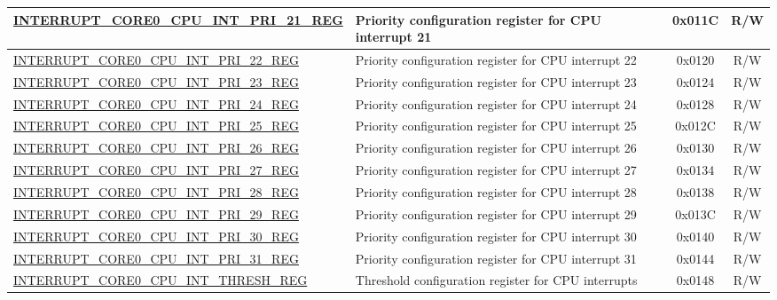 \begin{longtable}{ | p{8.0cm} | p{8.4cm} | c | c| }
\hyperref[regdesc:INTERRUPTCORE0CPUINTPRI0REG]{INTERRUPT\_CORE0\_CPU\_INT\_PRI\_21\_REG} & Priority configuration register for CPU interrupt 21 & 0x011C & R/W \\ \hline
\hyperref[regdesc:INTERRUPTCORE0CPUINTPRI0REG]{INTERRUPT\_CORE0\_CPU\_INT\_PRI\_22\_REG} & Priority configuration register for CPU interrupt 22 & 0x0120 & R/W \\ \hline
\hyperref[regdesc:INTERRUPTCORE0CPUINTPRI0REG]{INTERRUPT\_CORE0\_CPU\_INT\_PRI\_23\_REG} & Priority configuration register for CPU interrupt 23 & 0x0124 & R/W \\ \hline
\hyperref[regdesc:INTERRUPTCORE0CPUINTPRI0REG]{INTERRUPT\_CORE0\_CPU\_INT\_PRI\_24\_REG} & Priority configuration register for CPU interrupt 24 & 0x0128 & R/W \\ \hline
\hyperref[regdesc:INTERRUPTCORE0CPUINTPRI0REG]{INTERRUPT\_CORE0\_CPU\_INT\_PRI\_25\_REG} & Priority configuration register for CPU interrupt 25 & 0x012C & R/W \\ \hline
\hyperref[regdesc:INTERRUPTCORE0CPUINTPRI0REG]{INTERRUPT\_CORE0\_CPU\_INT\_PRI\_26\_REG} & Priority configuration register for CPU interrupt 26 & 0x0130 & R/W \\ \hline
\hyperref[regdesc:INTERRUPTCORE0CPUINTPRI0REG]{INTERRUPT\_CORE0\_CPU\_INT\_PRI\_27\_REG} & Priority configuration register for CPU interrupt 27 & 0x0134 & R/W \\ \hline
\hyperref[regdesc:INTERRUPTCORE0CPUINTPRI0REG]{INTERRUPT\_CORE0\_CPU\_INT\_PRI\_28\_REG} & Priority configuration register for CPU interrupt 28 & 0x0138 & R/W \\ \hline
\hyperref[regdesc:INTERRUPTCORE0CPUINTPRI0REG]{INTERRUPT\_CORE0\_CPU\_INT\_PRI\_29\_REG} & Priority configuration register for CPU interrupt 29 & 0x013C & R/W \\ \hline
\hyperref[regdesc:INTERRUPTCORE0CPUINTPRI0REG]{INTERRUPT\_CORE0\_CPU\_INT\_PRI\_30\_REG} & Priority configuration register for CPU interrupt 30 & 0x0140 & R/W \\ \hline
\hyperref[regdesc:INTERRUPTCORE0CPUINTPRI0REG]{INTERRUPT\_CORE0\_CPU\_INT\_PRI\_31\_REG} & Priority configuration register for CPU interrupt 31 & 0x0144 & R/W \\ \hline
\hyperref[regdesc:INTERRUPTCORE0CPUINTTHRESHREG]{INTERRUPT\_CORE0\_CPU\_INT\_THRESH\_REG} & Threshold configuration register for CPU interrupts & 0x0148 & R/W \\ \hline
\end{longtable}
